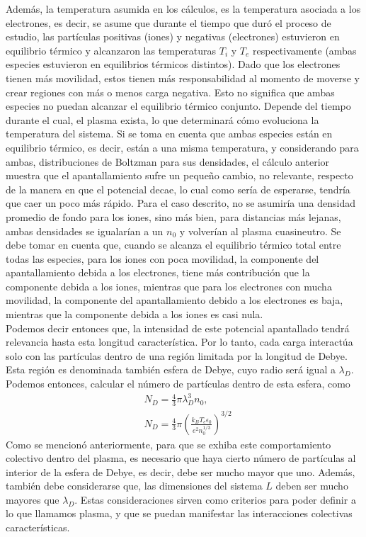 \documentclass[../main.tex]{subfiles}
\begin{document}
    Además, la temperatura asumida en los cálculos, es la temperatura asociada a los electrones, es decir, se asume que durante el tiempo que duró
    el proceso de estudio, las partículas positivas (iones) y negativas (electrones) estuvieron en equilibrio térmico y alcanzaron las temperaturas
    $T_i$ y $T_e$ respectivamente (ambas especies estuvieron en equilibrios térmicos distintos). Dado que los electrones tienen más movilidad,
    estos tienen más responsabilidad al momento de moverse y crear regiones con más o menos carga negativa. Esto no significa que ambas especies no puedan alcanzar el equilibrio térmico conjunto. Depende del tiempo durante el cual, el plasma exista,
    lo que determinará cómo evoluciona la temperatura del sistema. Si se toma en cuenta que ambas especies están en equilibrio térmico, es decir, están a una misma temperatura, y considerando para ambas, distribuciones 
    de Boltzman para sus densidades, el cálculo anterior muestra que el apantallamiento sufre un pequeño cambio, no relevante, respecto de la 
    manera en que el potencial decae, lo cual como sería de esperarse, tendría que caer un poco más rápido. Para el caso descrito, no se asumiría una densidad promedio de fondo para los iones, sino más bien, para distancias más lejanas, ambas densidades se 
    igualarían a un $n_0$ y volverían al plasma cuasineutro. Se debe tomar en cuenta que,  cuando se alcanza el equilibrio térmico total entre todas las especies, para los iones 
    con poca movilidad, la componente del apantallamiento debida a los electrones, tiene más contribución que la componente debida a los iones,
    mientras  que para los electrones con mucha movilidad, la componente del apantallamiento debido a los electrones es baja, mientras que la 
    componente debida a los iones es casi nula.\\
    
    Podemos decir entonces que, la intensidad de este potencial apantallado tendrá relevancia hasta esta longitud característica. Por lo tanto, cada carga interactúa solo con las partículas dentro de una región limitada por la longitud de Debye. Esta región es denominada también esfera de Debye, cuyo radio será igual a $\lambda_D$. Podemos entonces, calcular el número de partículas dentro de esta esfera, como
\begin{align}
&N_D = \frac{4}{3}\pi \lambda_D^3 n_0, \label{N_D} \\
&N_D = \frac{4}{3}\pi \left( \frac{k_BT_e\epsilon_0}{e^2n_0^{1/3}}\right)^{3/2}
\end{align}
Como se mencionó anteriormente, para que se exhiba este comportamiento colectivo dentro del plasma, es necesario que haya cierto número de partículas al interior de la esfera de Debye, es decir, debe ser mucho mayor que uno. Además, también debe considerarse que, las dimensiones del sistema $L$ deben ser mucho mayores que $\lambda_D$. Estas consideraciones sirven como criterios para poder definir a lo que llamamos plasma, y que se puedan manifestar las interacciones colectivas características. \\
\end{document}
